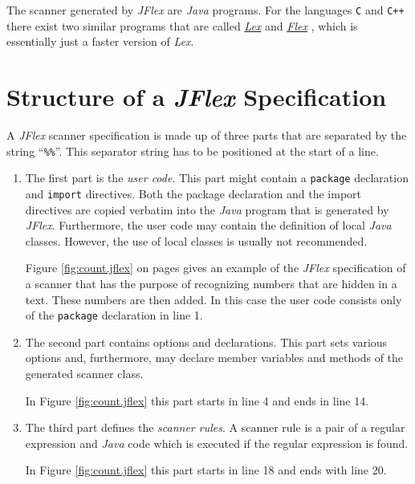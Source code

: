 The scanner generated by \textsl{JFlex}\/ are \textsl{Java} programs.  For the languages \texttt{C}
and \texttt{C++} there exist two similar programs that are called 
\href{http://en.wikipedia.org/wiki/Lex_(software)}{\textsl{Lex}}
\cite{lesk:1975} and \href{http://flex.sourceforge.net}{\textsl{Flex}} \cite{nicol93}, which is
essentially just a faster version of \textsl{Lex}.


\section{Structure of a \textsl{JFlex} Specification}
A  \textsl{JFlex} scanner specification is made up of three parts that are separated by the string
``\texttt{\%\%}''.
This separator string has to be positioned at the start of a line.
\begin{enumerate}
\item The first part is the  \emph{user code}.  This part might contain a
      \texttt{package} declaration and \texttt{import} directives.  Both the package declaration and
      the import directives are copied verbatim into the \textsl{Java} program that is generated by
      \textsl{JFlex}.  Furthermore, the user code may contain the definition of local \textsl{Java}
      classes.  However, the use of local classes is usually not recommended.

      Figure \ref{fig:count.jflex} on pages \pageref{fig:count.jflex} gives an example of the
      \textsl{JFlex} specification of a scanner that has the purpose of recognizing numbers that are
      hidden in a text.  These numbers are then added.
      In this case the user code consists only of the \texttt{package} declaration in line 1.
\item The second part contains options and declarations.  This part sets various options and,
      furthermore, may declare member variables and methods of the generated scanner class.

      In Figure \ref{fig:count.jflex} this part starts in line  4 and ends in line 14.
\item The third part defines the \emph{scanner rules}.  A scanner rule is a pair of a regular
      expression and \textsl{Java} code which is executed if the regular expression is found.

      In Figure \ref{fig:count.jflex} this part starts in line 18 and ends with line 20. 
\end{enumerate}

